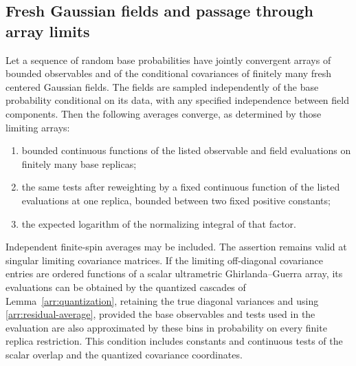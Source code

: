\subsection{Fresh Gaussian fields and passage through array limits}

\begin{lemma}
\label{arr:limit}
Let a sequence of random base probabilities have jointly convergent
arrays of bounded observables and of the conditional covariances of
finitely many fresh centered Gaussian fields.  The fields are sampled
independently of the base probability conditional on its data, with any
specified independence between field components.  Then the following
averages converge, as determined by those limiting arrays:
\begin{enumerate}
 \item bounded continuous functions of the listed observable and field
 evaluations on finitely many base replicas;
 \item the same tests after reweighting by a fixed continuous function
 of the listed evaluations at one replica, bounded between two fixed
 positive constants;
 \item the expected logarithm of the normalizing integral of that factor.
\end{enumerate}
Independent finite-spin averages may be included.  The assertion remains
valid at singular limiting covariance matrices.  If the limiting
off-diagonal covariance entries are ordered functions of a scalar
ultrametric Ghirlanda--Guerra array, its evaluations can be obtained by
the quantized cascades of Lemma~\ref{arr:quantization}, retaining the true
diagonal variances and using \eqref{arr:residual-average}, provided the
base observables and tests used in the evaluation are also approximated
by these bins in probability on every finite replica restriction.  This
condition includes constants and continuous tests of the scalar overlap
and the quantized covariance coordinates.
\end{lemma}

